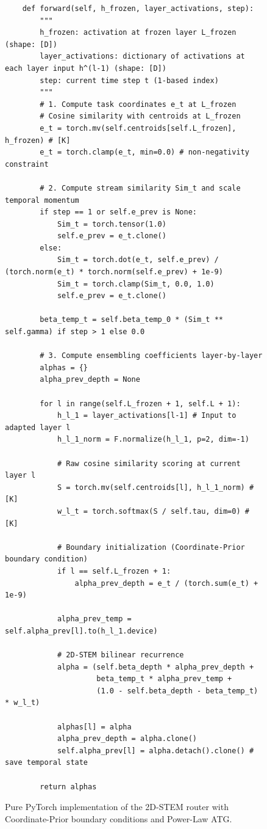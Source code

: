 \begin{figure}[htbp]
\begin{minipage}{0.95\textwidth}
\begin{small}
\begin{verbatim}
    def forward(self, h_frozen, layer_activations, step):
        """
        h_frozen: activation at frozen layer L_frozen (shape: [D])
        layer_activations: dictionary of activations at each layer input h^(l-1) (shape: [D])
        step: current time step t (1-based index)
        """
        # 1. Compute task coordinates e_t at L_frozen
        # Cosine similarity with centroids at L_frozen
        e_t = torch.mv(self.centroids[self.L_frozen], h_frozen) # [K]
        e_t = torch.clamp(e_t, min=0.0) # non-negativity constraint
        
        # 2. Compute stream similarity Sim_t and scale temporal momentum
        if step == 1 or self.e_prev is None:
            Sim_t = torch.tensor(1.0)
            self.e_prev = e_t.clone()
        else:
            Sim_t = torch.dot(e_t, self.e_prev) / (torch.norm(e_t) * torch.norm(self.e_prev) + 1e-9)
            Sim_t = torch.clamp(Sim_t, 0.0, 1.0)
            self.e_prev = e_t.clone()
            
        beta_temp_t = self.beta_temp_0 * (Sim_t ** self.gamma) if step > 1 else 0.0
        
        # 3. Compute ensembling coefficients layer-by-layer
        alphas = {}
        alpha_prev_depth = None
        
        for l in range(self.L_frozen + 1, self.L + 1):
            h_l_1 = layer_activations[l-1] # Input to adapted layer l
            h_l_1_norm = F.normalize(h_l_1, p=2, dim=-1)
            
            # Raw cosine similarity scoring at current layer l
            S = torch.mv(self.centroids[l], h_l_1_norm) # [K]
            w_l_t = torch.softmax(S / self.tau, dim=0) # [K]
            
            # Boundary initialization (Coordinate-Prior boundary condition)
            if l == self.L_frozen + 1:
                alpha_prev_depth = e_t / (torch.sum(e_t) + 1e-9)
                
            alpha_prev_temp = self.alpha_prev[l].to(h_l_1.device)
            
            # 2D-STEM bilinear recurrence
            alpha = (self.beta_depth * alpha_prev_depth + 
                     beta_temp_t * alpha_prev_temp + 
                     (1.0 - self.beta_depth - beta_temp_t) * w_l_t)
            
            alphas[l] = alpha
            alpha_prev_depth = alpha.clone()
            self.alpha_prev[l] = alpha.detach().clone() # save temporal state
            
        return alphas
\end{verbatim}
\end{small}
\caption{Pure PyTorch implementation of the 2D-STEM router with Coordinate-Prior boundary conditions and Power-Law ATG.}
\label{lst:pytorch_code}
\end{minipage}
\end{figure}

